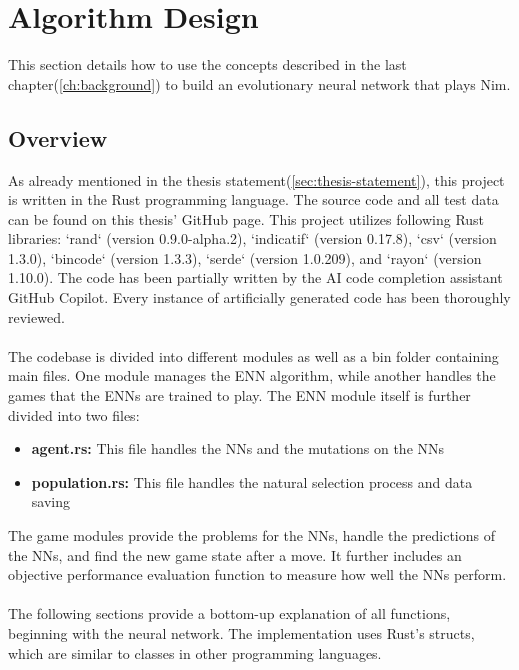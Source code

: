 \section{Algorithm Design}\label{sec:algorithm-design}
This section details how to use the concepts described in the last chapter(\ref{ch:background}) to build an evolutionary neural network that plays Nim.

\subsection{Overview}\label{subsec:overview}
As already mentioned in the thesis statement(\ref{sec:thesis-statement}), this project is written in the Rust programming language.\cite{rust, rust23}
The source code and all test data can be found on this thesis' GitHub page.\cite{RustENN}
This project utilizes following Rust libraries:
`rand` (version 0.9.0-alpha.2)\cite{rand2024},
`indicatif` (version 0.17.8)\cite{indicatif2023},
`csv` (version 1.3.0)\cite{csv2023},
`bincode` (version 1.3.3)\cite{bincode2021},
`serde` (version 1.0.209)\cite{serde2024},
and `rayon` (version 1.10.0)\cite{rayon2023}.
The code has been partially written by the AI code completion assistant GitHub Copilot\cite{github_copilot2021}.
Every instance of artificially generated code has been thoroughly reviewed.
\\ \\
The codebase is divided into different modules as well as a bin folder containing main files.
One module manages the ENN algorithm, while another handles the games that the ENNs are trained to play.
The ENN module itself is further divided into two files:
\begin{itemize}
    \item \textbf{agent.rs:} This file handles the NNs and the mutations on the NNs
    \item \textbf{population.rs:} This file handles the natural selection process and data saving
\end{itemize}
The game modules provide the problems for the NNs, handle the predictions of the NNs, and find the new game state after a move.
It further includes an objective performance evaluation function to measure how well the NNs perform.
\\ \\
The following sections provide a bottom-up explanation of all functions, beginning with the neural network.
The implementation uses Rust's structs, which are similar to classes in other programming languages.

